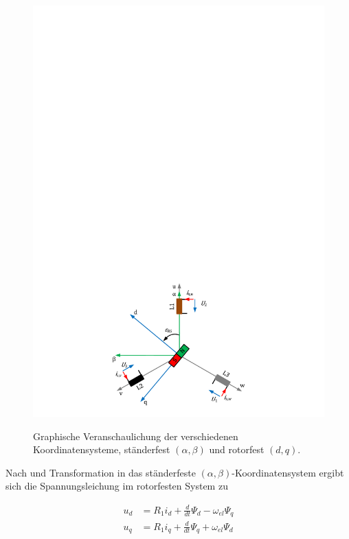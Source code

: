\documentclass[conference,twocolumn]{IEEEtran}
\begin{document}
\begin{figure}
\centering
\includegraphics[width=\columnwidth]{img/synchron-grundlage}
\label{fig:synchron-grundlage}
\caption{Graphische Veranschaulichung der verschiedenen Koordinatensysteme, ständerfest $(\alpha, \beta)$ und rotorfest $(d, q)$.}
\end{figure}

Nach \textcite{ternesfeldkamp} und Transformation in das ständerfeste $(\alpha, \beta)$-Koordinatensystem ergibt sich die Spannungsleichung im rotorfesten System zu

\begin{align}
u_d &= R_1 i_d + \frac{d}{dt}\Psi_d - \omega_{el} \Psi_q \label{eqn:ud} \\ 
u_q &= R_1 i_q + \frac{d}{dt}\Psi_q + \omega_{el} \Psi_d \label{eqn:uq}
\end{align}
\end{document}
